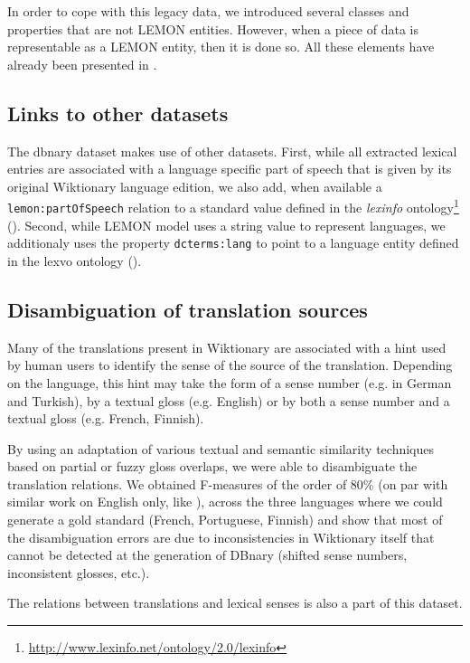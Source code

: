 \documentclass[10pt, a4paper]{article}
\begin{document}
In order to cope with this legacy data, we introduced several classes and properties that are not LEMON entities. However, when a piece of data is representable as a LEMON entity, then it is done so. All these elements have already been presented in \cite{serasset:dbnary-swj}.

\subsection{Links to other datasets}

The dbnary dataset makes use of other datasets. First, while all extracted lexical entries are associated with a language specific part of speech that is given by its original Wiktionary language edition, we also add, when available a \texttt{lemon:partOfSpeech} relation to a standard value defined in the \textit{lexinfo} ontology\footnote{\url{http://www.lexinfo.net/ontology/2.0/lexinfo}} (\cite{Lexinfo}). Second, while LEMON model uses a string value to represent languages, we additionaly uses the property \texttt{dcterms:lang} to point to a language entity defined in the lexvo ontology (\cite{deMeloWeikum2008c}).

\subsection{Disambiguation of translation sources}

Many of the translations present in Wiktionary are associated with a hint used by human users to identify the sense of the source of the translation. Depending on the language, this hint may take the form of a sense number (e.g. in German and Turkish), by a textual gloss (e.g. English) or by both a sense number and a textual gloss (e.g. French, Finnish).

By using an adaptation of various textual and semantic similarity techniques based on partial or fuzzy gloss overlaps, we were able to disambiguate the translation relations. We obtained F-measures of the order of 80\% (on par with similar work on English only, like \cite{meyer-gurevych:2012:PAPERS}), across the three languages where we could generate a gold standard (French, Portuguese, Finnish) and show that most of the disambiguation errors are due to inconsistencies in Wiktionary itself that cannot be detected at the generation of DBnary (shifted sense numbers, inconsistent glosses, etc.).  

The relations between translations and lexical senses is also a part of this dataset.
\end{document}
